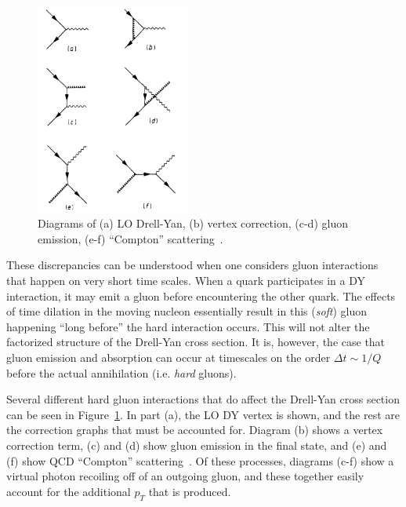 \begin{figure}
	\centering
	\includegraphics[width=0.45\textwidth]{figures/background/DY-NLO.png}
	\caption{Diagrams of (a) LO Drell-Yan, (b) vertex correction, (c-d) gluon emission, (e-f) ``Compton'' scattering~\cite{Kenyon:1982tg}.}
	\vspace{-20pt}
	\label{fig:DY-NLO}
\end{figure}
These discrepancies can be understood when one considers gluon interactions that happen on very short time scales. When a quark participates in a DY interaction, it may emit a gluon before encountering the other quark. The effects of time dilation in the moving nucleon essentially result in this (\emph{soft}) gluon happening ``long before'' the hard interaction occurs. This will not alter the factorized structure of the Drell-Yan cross section. It is, however, the case that gluon emission and absorption can occur at timescales on the order $\Delta t \sim 1/Q$ before the actual annihilation (i.e. \emph{hard} gluons). 

Several different hard gluon interactions that do affect the Drell-Yan cross section can be seen in Figure~\ref{fig:DY-NLO}.  In part (a), the LO DY vertex is shown, and the rest are the correction graphs that must be accounted for. Diagram (b) shows a vertex correction term, (c) and (d) show gluon emission in the final state, and (e) and (f) show QCD ``Compton'' scattering~\cite{Kenyon:1982tg}. Of these processes, diagrams (c-f) show a virtual photon recoiling off of an outgoing gluon, and these together easily account for the additional $p_T$ that is produced. 

